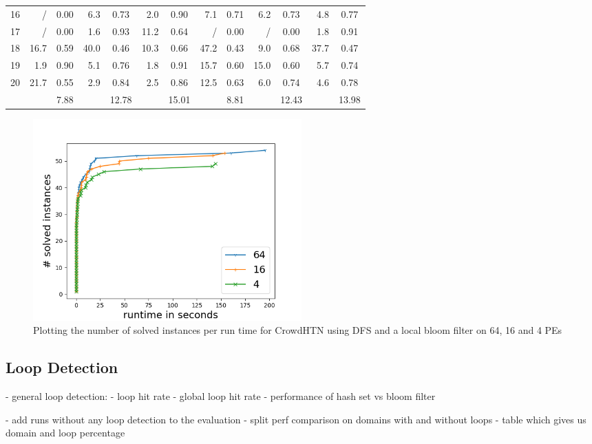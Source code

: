 \begin{table}
\begin{tabular}{|l|rc|rc|rc|rc|rc|rc|}
		16 & / & 0.00 & 6.3 & 0.73 & 2.0 & 0.90 & 7.1 & 0.71 & 6.2 & 0.73 & 4.8 & 0.77\\
		17 & / & 0.00 & 1.6 & 0.93 & 11.2 & 0.64 & / & 0.00 & / & 0.00 & 1.8 & 0.91\\
		18 & 16.7 & 0.59 & 40.0 & 0.46 & 10.3 & 0.66 & 47.2 & 0.43 & 9.0 & 0.68 & 37.7 & 0.47\\
		19 & 1.9 & 0.90 & 5.1 & 0.76 & 1.8 & 0.91 & 15.7 & 0.60 & 15.0 & 0.60 & 5.7 & 0.74\\
		20 & 21.7 & 0.55 & 2.9 & 0.84 & 2.5 & 0.86 & 12.5 & 0.63 & 6.0 & 0.74 & 4.6 & 0.78\\
		\hline
		& & 7.88 & & 12.78 & & 15.01 & & 8.81 & & 12.43 & & 13.98\\
		\hline
	\end{tabular}
\end{table}

\begin{figure}
	\caption{Plotting the number of solved instances per run time for CrowdHTN using DFS and a local bloom filter on 64, 16 and 4 PEs}
	\label{figure: eval scalability}
	\centering
	\includegraphics[width=0.5\textwidth]{images/final/scalability}
\end{figure}

\subsection{Loop Detection}
\label{eval: loop detection}
- general loop detection:
- loop hit rate
- global loop hit rate
- performance of hash set vs bloom filter

- add runs without any loop detection to the evaluation
- split perf comparison on domains with and without loops
- table which gives us domain and loop percentage

